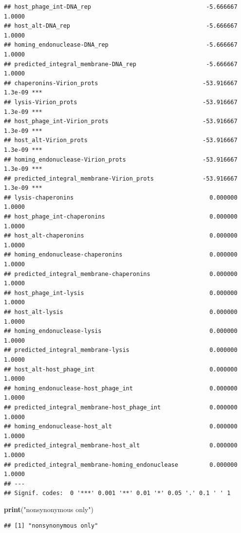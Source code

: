 \documentclass[
]{article}
\newenvironment{Shaded}{\begin{snugshade}}{\end{snugshade}}
\newcommand{\KeywordTok}[1]{\textcolor[rgb]{0.13,0.29,0.53}{\textbf{#1}}}
\newcommand{\NormalTok}[1]{#1}
\newcommand{\StringTok}[1]{\textcolor[rgb]{0.31,0.60,0.02}{#1}}
\begin{document}
\begin{verbatim}
## host_phage_int-DNA_rep                                 -5.666667  1.0000    
## host_alt-DNA_rep                                       -5.666667  1.0000    
## homing_endonuclease-DNA_rep                            -5.666667  1.0000    
## predicted_integral_membrane-DNA_rep                    -5.666667  1.0000    
## chaperonins-Virion_prots                              -53.916667 1.3e-09 ***
## lysis-Virion_prots                                    -53.916667 1.3e-09 ***
## host_phage_int-Virion_prots                           -53.916667 1.3e-09 ***
## host_alt-Virion_prots                                 -53.916667 1.3e-09 ***
## homing_endonuclease-Virion_prots                      -53.916667 1.3e-09 ***
## predicted_integral_membrane-Virion_prots              -53.916667 1.3e-09 ***
## lysis-chaperonins                                       0.000000  1.0000    
## host_phage_int-chaperonins                              0.000000  1.0000    
## host_alt-chaperonins                                    0.000000  1.0000    
## homing_endonuclease-chaperonins                         0.000000  1.0000    
## predicted_integral_membrane-chaperonins                 0.000000  1.0000    
## host_phage_int-lysis                                    0.000000  1.0000    
## host_alt-lysis                                          0.000000  1.0000    
## homing_endonuclease-lysis                               0.000000  1.0000    
## predicted_integral_membrane-lysis                       0.000000  1.0000    
## host_alt-host_phage_int                                 0.000000  1.0000    
## homing_endonuclease-host_phage_int                      0.000000  1.0000    
## predicted_integral_membrane-host_phage_int              0.000000  1.0000    
## homing_endonuclease-host_alt                            0.000000  1.0000    
## predicted_integral_membrane-host_alt                    0.000000  1.0000    
## predicted_integral_membrane-homing_endonuclease         0.000000  1.0000    
## ---
## Signif. codes:  0 '***' 0.001 '**' 0.01 '*' 0.05 '.' 0.1 ' ' 1
\end{verbatim}

\begin{Shaded}
\begin{Highlighting}[]
\KeywordTok{print}\NormalTok{(}\StringTok{"nonsynonymous only"}\NormalTok{)}
\end{Highlighting}
\end{Shaded}

\begin{verbatim}
## [1] "nonsynonymous only"
\end{verbatim}
\end{document}
